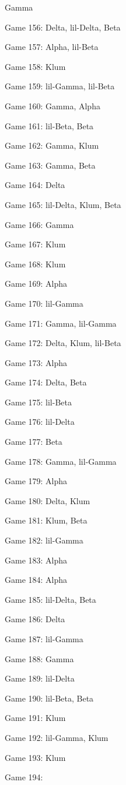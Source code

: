 \documentclass{article}
\begin{document}
\begin{multicols}{3}
\begin{compactitem}
Gamma
\item Game 156:
Delta, lil-Delta, Beta
\item Game 157:
Alpha, lil-Beta
\item Game 158:
Klum
\item Game 159:
lil-Gamma, lil-Beta
\item Game 160:
Gamma, Alpha
\item Game 161:
lil-Beta, Beta
\item Game 162:
Gamma, Klum
\item Game 163:
Gamma, Beta
\item Game 164:
Delta
\item Game 165:
lil-Delta, Klum, Beta
\item Game 166:
Gamma
\item Game 167:
Klum
\item Game 168:
Klum
\item Game 169:
Alpha
\item Game 170:
lil-Gamma
\item Game 171:
Gamma, lil-Gamma
\item Game 172:
Delta, Klum, lil-Beta
\item Game 173:
Alpha
\item Game 174:
Delta, Beta
\item Game 175:
lil-Beta
\item Game 176:
lil-Delta
\item Game 177:
Beta
\item Game 178:
Gamma, lil-Gamma
\item Game 179:
Alpha
\item Game 180:
Delta, Klum
\item Game 181:
Klum, Beta
\item Game 182:
lil-Gamma
\item Game 183:
Alpha
\item Game 184:
Alpha
\item Game 185:
lil-Delta, Beta
\item Game 186:
Delta
\item Game 187:
lil-Gamma
\item Game 188:
Gamma
\item Game 189:
lil-Delta
\item Game 190:
lil-Beta, Beta
\item Game 191:
Klum
\item Game 192:
lil-Gamma, Klum
\item Game 193:
Klum
\item Game 194:

\end{compactitem}
\end{multicols}
\end{document}
